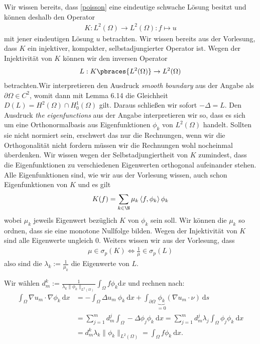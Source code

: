\begin{solution}

	Wir wissen bereits, dass \eqref{poisson} eine eindeutige schwache Lösung besitzt und können deshalb den Operator 
	\begin{align*}
	K: L^2(\Omega) \to L^2(\Omega): f \mapsto u
	\end{align*}
	mit jener eindeutigen Lösung $u$ betrachten. Wir wissen bereits aus der Vorlesung, dass $K$ ein injektiver, kompakter, selbstadjungierter Operator ist. Wegen der Injektivität von $K$ können wir den inversen Operator 
	\begin{align*}
	L: K\pbraces{L^2(\Omega)} \to L^2(\Omega)
	\end{align*}
	betrachten.Wir interpretieren den Ausdruck \textit{smooth boundary} aus der Angabe als $\partial \Omega \in C^2$, womit dann mit Lemma 6.14 die Gleichheit $D(L) = H^2(\Omega) \cap H_0^1(\Omega)$ gilt. Daraus schließen wir sofort $-\Delta = L$. Den Ausdruck \textit{the eigenfunctions} aus der Angabe interpretieren wir so, dass es sich um eine Orthonormalbasis aus Eigenfunktionen $\phi_k$ von $L^2(\Omega)$ handelt. Sollten sie nicht normiert sein, erschwert das nur die Rechnungen, wenn wir die Orthogonalität nicht fordern müssen wir die Rechnungen wohl nocheinmal überdenken. Wir wissen wegen der Selbstadjungiertheit von $K$ zumindest, dass die Eigenfunktionen zu verschiedenen Eigenwerten orthogonal aufeinander stehen. Alle Eigenfunktionen sind, wie wir aus der Vorlesung wissen, auch schon Eigenfunktionen von $K$ und es gilt \begin{align*}
	K(f) = \sum_{k \in \N} \mu_k \left\langle f, \phi_k \right\rangle \phi_k
	\end{align*}
	wobei $\mu_k$ jeweils Eigenwert bezüglich $K$ von $\phi_k$ sein soll. Wir können die $\mu_k$ so ordnen, dass sie eine monotone Nullfolge bilden. Wegen der Injektivität von $K$ sind alle Eigenwerte ungleich $0$. Weiters wissen wir aus der Vorlesung, dass 
	\begin{align*}
	\mu \in \sigma_p(K) \Leftrightarrow \frac{1}{\mu} \in \sigma_p(L)
	\end{align*}
	also sind die $\lambda_k := \frac{1}{\mu_k}$ die Eigenwerte von $L$.

  Wir wählen $d_m^k := \frac{1}{\lambda_k \|\phi_k\|_{L^2(\Omega)}} \int_\Omega f \phi_k \mathrm{d}x$ und rechnen nach:
  \begin{align*}
  \int_\Omega \nabla u_m \cdot \nabla \phi_k \mathrm{~d}x
  &= -\int_\Omega \Delta u_m~\phi_k \mathrm{~d}x + \int_{\partial\Omega} \underbrace{\phi_k}_{= 0} (\nabla u_m \cdot \nu) \mathrm{~d}s\\
  &= \sum_{j = 1}^m d_m^j \int_\Omega -\Delta \phi_j \phi_k \mathrm{~d}x
  = \sum_{j = 1}^m d_m^j \lambda_j \int_\Omega \phi_j \phi_k \mathrm{~d}x\\
  &= d_m^k \lambda_k \|\phi_k\|_{L^2(\Omega)} = \int_\Omega f \phi_k \mathrm{~d}x.
  \end{align*}


\end{solution}
